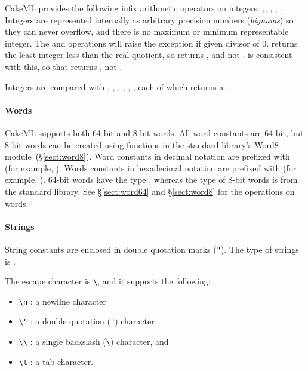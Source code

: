 \documentclass[12pt,a4paper]{book}
\begin{document}
CakeML provides the following infix arithmetic operators on integers: \smlinline{+},\smlinline{-}, \smlinline{*}, , . Integers are represented internally as arbitrary precision numbers (\emph{bignums}) so they can never overflow, and there is no maximum or minimum representable integer. The  and  operations will raise the  exception if given divisor of 0.  returns the least integer less than the real quotient, so  returns , and not .  is consistent with this, so that  returns , not .

Integers are compared with \smlinline{=}, \smlinline{<>}, \smlinline{<}, \smlinline{>}, \smlinline{<=}, \smlinline{>=}, each of which returns a .

\paragraph{Words} CakeML supports both 64-bit and 8-bit words. All word
constants are 64-bit, but 8-bit words can be created using functions in the
standard library's Word8 module~(\S\ref{sect:word8}). Word constants in decimal
notation are prefixed with  (for example, ).
Words constants in hexadecimal notation are prefixed with  (for
example, ). 64-bit words have the type , whereas
the type of 8-bit words is  from the standard library.
See \S\ref{sect:word64} and \S\ref{sect:word8} for the operations on words.

\paragraph{Strings} String constants are enclosed in double quotation marks (\texttt{"}). The type of strings is .

The escape character is \verb|\|, and it supports the following:
\begin{itemize}
\item
\verb|\n| : a newline character
\item
\verb|\"| : a double quotation (\texttt{"}) character
\item
\verb|\\| : a single backslash (\verb|\|) character, and
\item
\verb|\t| : a tab character.
\end{itemize}
\end{document}
